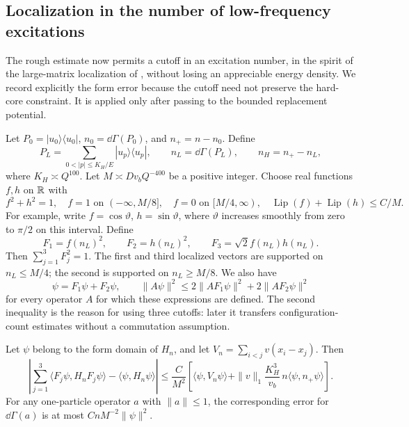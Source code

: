 \subsection{Localization in the number of low-frequency excitations}
\label{en:localization-section}

The rough estimate now permits a cutoff in an excitation number, in the spirit of the large-matrix localization of \cite[Appendix~A]{LS2001}, without
losing an appreciable energy density.  We record explicitly the form
error because the cutoff need not preserve the hard-core constraint.
It is applied only after passing to the bounded replacement potential.

Let \(P_0=|u_0\rangle\langle u_0|\),
\(n_0=\dd\Gamma(P_0)\), and \(n_+=n-n_0\).  Define
\[
 P_L=\sum_{0<|p|\le K_H/E}|u_p\rangle\langle u_p|,
 \qquad n_L=\dd\Gamma(P_L),\qquad n_H=n_+-n_L,
\]
where \(K_H\asymp Q^{100}\).  Let
\(M\asymp Dv_bQ^{-400}\) be a positive integer.  Choose real
functions \(f,h\) on \(\mathbb R\) with
\[
 f^2+h^2=1,\quad f=1\text{ on }(-\infty,M/8],\quad
 f=0\text{ on }[M/4,\infty),\quad
 \operatorname{Lip}(f)+\operatorname{Lip}(h)\le C/M.
\]
For example, write \(f=\cos\vartheta\), \(h=\sin\vartheta\),
where \(\vartheta\) increases smoothly from zero to \(\pi/2\)
on this interval.  Define
\begin{equation}\label{en:three-cutoffs}
 F_1=f(n_L)^2,\qquad F_2=h(n_L)^2,\qquad
 F_3=\sqrt2 f(n_L)h(n_L).
\end{equation}
Then \(\sum_{j=1}^3F_j^2=1\).  The first and third localized
vectors are supported on \(n_L\le M/4\); the second is supported
on \(n_L\ge M/8\).  We also have
\begin{equation}\label{en:count-reconstruction}
 \psi=F_1\psi+F_2\psi,\qquad
 \|A\psi\|^2\le2\|AF_1\psi\|^2+2\|AF_2\psi\|^2
\end{equation}
for every operator \(A\) for which these expressions are defined.
The second inequality is the reason for using three cutoffs: later it
transfers configuration-count estimates without a commutation assumption.

\begin{lemma}\label{en:cutoff-error}\label{en:localization}
Let \(\psi\) belong to the form domain of \(H_n\), and let
\(V_n=\sum_{i<j}v(x_i-x_j)\).  Then
\begin{equation}\label{en:cutoff-form-error}
 \left|\sum_{j=1}^3\langle F_j\psi,H_nF_j\psi\rangle
                   -\langle\psi,H_n\psi\rangle\right|
 \le\frac{C}{M^2}\left[
     \langle\psi,V_n\psi\rangle
       +\|v\|_1\frac{K_H^3}{v_b}\,
                  n\langle\psi,n_+\psi\rangle\right].
\end{equation}
For any one-particle operator \(a\) with \(\|a\|\le1\), the
corresponding error for \(\dd\Gamma(a)\) is at most
\(CnM^{-2}\|\psi\|^2\).
\end{lemma}


